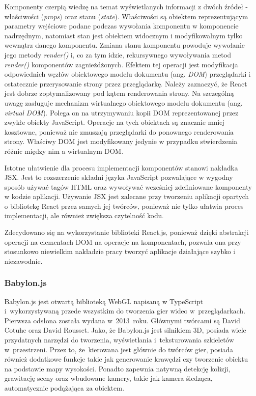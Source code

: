 \documentclass[12pt,a4paper,polish,thesis]{dcsbook}
\begin{document}
{   Komponenty czerpią wiedzę na temat wyświetlanych informacji z dwóch źródeł - właściwości (\textit{props}) oraz stanu (\textit{state}). Właściwości są obiektem reprezentującym parametry wejściowe podane podczas wywołania komponentu w komponencie nadrzędnym, natomiast stan jest obiektem widocznym i modyfikowalnym tylko wewnątrz danego komponentu. Zmiana stanu komponentu powoduje wywołanie jego metody \textit{render()} i, co za tym idzie, rekursywnego wywoływania metod \textit{render()} komponentów zagnieżdżonych. Efektem tej operacji jest modyfikacja odpowiednich węzłów obiektowego modelu dokumentu (ang. \textit{DOM}) przeglądarki i ostatecznie przerysowanie strony przez przeglądarkę. Należy zaznaczyć, że React jest dobrze zoptymalizowany pod kątem renderowania strony. Na szczególną uwagę zasługuje mechanizm wirtualnego obiektowego modelu dokumentu (ang. \textit{virtual DOM}). Polega on na utrzymywaniu kopii DOM reprezentowanej przez zwykłe obiekty JavaScript. Operacje na tych obiektach są znacznie mniej kosztowne, ponieważ nie zmuszają przeglądarki do ponownego renderowania strony. Właściwy DOM jest modyfikowany jedynie w przypadku stwierdzenia różnic między nim a wirtualnym DOM.

   Istotne ułatwienie dla procesu implementacji komponentów stanowi nakładka JSX. Jest to rozszerzenie składni języka JavaScript pozwalające w wygodny sposób używać tagów HTML oraz wywoływać wcześniej zdefiniowane komponenty w kodzie aplikacji. Używanie JSX jest zalecane przy tworzeniu aplikacji opartych o bibliotekę React przez samych jej twórców, ponieważ nie tylko ułatwia proces implementacji, ale również zwiększa czytelność kodu.

   Zdecydowano się na wykorzystanie biblioteki React.js, ponieważ dzięki abstrakcji operacji na elementach DOM na operacje na komponentach, pozwala ona przy stosunkowo niewielkim nakładzie pracy tworzyć aplikacje działające szybko i niezawodnie.

	\subsubsection{Babylon.js}

	Babylon.js jest otwartą biblioteką WebGL napisaną w TypeScript i~wykorzystywaną przede wszystkim do tworzenia gier wideo w~przeglądarkach. Pierwsza odsłona została wydana w~2013~roku. Głównymi twórcami są David Cotuhe oraz David Rousset. Jako, że Babylon.js jest silnikiem 3D, posiada wiele przydatnych narzędzi do tworzenia, wyświetlania i~teksturowania szkieletów w~przestrzeni. Przez to, że~kierowana jest głównie do twórców gier, posiada również dodatkowe funkcje takie jak generowanie krawędzi czy tworzenie obiektu na podstawie mapy wysokości. Ponadto zapewnia natywną detekcję kolizji, grawitację sceny oraz wbudowane kamery, takie jak kamera śledząca, automatycznie podążająca za obiektem.

}
\end{document}
